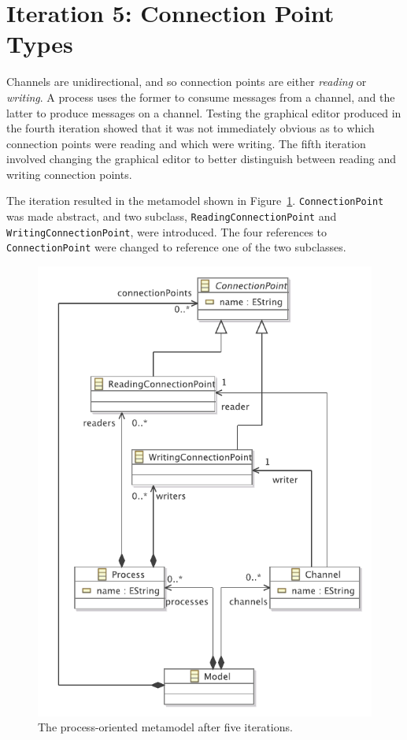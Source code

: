 \clearpage

\section{Iteration 5: Connection Point Types}
\label{sec:po_it5}
Channels are unidirectional, and so connection points are either \emph{reading} or \emph{writing}. A process uses the former to consume messages from a channel, and the latter to produce messages on a channel. Testing the graphical editor produced in the fourth iteration showed that it was not immediately obvious as to which connection points were reading and which were writing. The fifth iteration involved changing the graphical editor to better distinguish between reading and writing connection points.

The iteration resulted in the metamodel shown in Figure~\ref{fig:po_it5_mm}. \texttt{Co\-nn\-ec\-ti\-o\-nP\-oi\-nt} was made abstract, and two subclass, \texttt{Re\-a\-di\-ngCo\-nn\-ec\-ti\-o\-nP\-oi\-nt} and \texttt{Wr\-i\-ti\-ngCo\-nn\-ec\-ti\-o\-nP\-oi\-nt}, were introduced. The four references to \texttt{Co\-nn\-ec\-ti\-o\-nP\-oi\-nt} were changed to reference one of the two subclasses.

\begin{figure}[htbp]
	\centering
		\includegraphics[scale=0.75]{A.2.ProcessOriented/images/5_mm.pdf}
	\caption{The process-oriented metamodel after five iterations.}
	\label{fig:po_it5_mm}
\end{figure}

